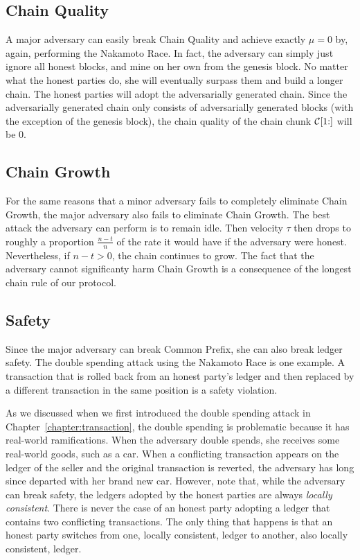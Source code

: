 \subsection*{Chain Quality}
A major adversary can easily break Chain Quality and achieve exactly $\mu = 0$ by, again,
performing the Nakamoto Race. In fact, the adversary can simply just ignore all honest blocks,
and mine on her own from the genesis block. No matter what the honest parties do, she will eventually
surpass them and build a longer chain. The honest parties will adopt the adversarially generated
chain. Since the adversarially generated chain only consists of adversarially generated blocks
(with the exception of the genesis block), the chain quality of the chain chunk $\mathcal{C}[1{:}]$
will be $0$.

\subsection*{Chain Growth}
For the same reasons that a minor adversary fails to completely eliminate Chain Growth, the
major adversary also fails to eliminate Chain Growth. The best attack the adversary can perform
is to remain idle. Then velocity $\tau$ then drops to roughly a proportion $\frac{n - t}{n}$ of the rate
it would have if the adversary were honest. Nevertheless, if $n - t > 0$, the chain continues
to grow. The fact that the adversary cannot significanty harm Chain Growth is a consequence of
the longest chain rule of our protocol.

\subsection*{Safety}
Since the major adversary can break Common Prefix, she can also break ledger safety. The double
spending attack using the Nakamoto Race is one example. A transaction that is rolled back from
an honest party's ledger and then replaced by a different transaction in the same position
is a safety violation.

As we discussed when we first introduced the double spending attack in Chapter~\ref{chapter:transaction},
the double spending is problematic because it has real-world ramifications. When the adversary double
spends, she receives some real-world goods, such as a car. When a conflicting transaction appears on
the ledger of the seller and the original transaction is reverted, the adversary has long since
departed with her brand new car. However, note that, while the adversary can break safety, the
ledgers adopted by the honest parties are always \emph{locally consistent}. There is never the
case of an honest party adopting a ledger that contains two conflicting transactions. The only
thing that happens is that an honest party switches from one, locally consistent, ledger to another,
also locally consistent, ledger.

